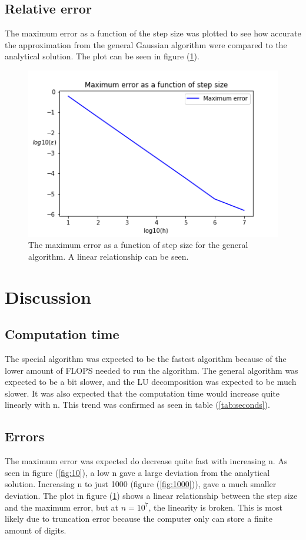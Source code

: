 \documentclass[12pt]{article}
\begin{document}
\subsection{Relative error}
The maximum error as a function of the step size was plotted to see how accurate the approximation from the general Gaussian algorithm were compared to the analytical solution. The plot can be seen in figure (\ref{fig:error}).
\begin{figure}
\caption{The maximum error as a function of step size for the general algorithm. A linear relationship can be seen. }
\label{fig:error}
\includegraphics[]{h_epsilon.png}
\end{figure}
\section{Discussion}
\subsection{Computation time}
The special algorithm was expected to be the fastest algorithm because of the lower amount of FLOPS needed to run the algorithm. The general algorithm was expected to be a bit slower, and the LU decomposition was expected to be much slower. It was also expected that the computation time would increase quite linearly with n. This trend was confirmed as seen in table (\ref{tab:seconds}).

\subsection{Errors}
The maximum error was expected do decrease quite fast with increasing n. As seen in figure (\ref{fig:10}), a low n gave a large deviation from the analytical solution. Increasing n to just 1000 (figure (\ref{fig:1000})), gave a much smaller deviation.
	The plot in figure (\ref{fig:error}) shows a linear relationship between the step size and the maximum error, but at $n = 10^{7}$, the linearity is broken. This is most likely due to truncation error because the computer only can store a finite amount of digits. 
\end{document}
